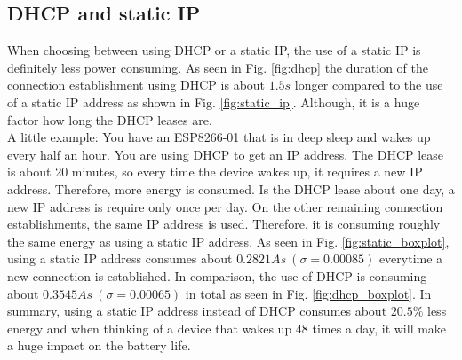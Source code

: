 \subsection{DHCP and static IP}
When choosing between using DHCP or a static IP, the use of a static IP is definitely less power consuming.
As seen in Fig. \ref{fig:dhcp} the duration of the connection establishment using DHCP is about $1.5 s$ longer compared to the use of a static IP address as shown in Fig. \ref{fig:static_ip}.
Although, it is a huge factor how long the DHCP leases are.\\
A little example: You have an ESP8266-01 that is in deep sleep and wakes up every half an hour. You are using DHCP to get an IP address.
The DHCP lease is about 20 minutes, so every time the device wakes up, it requires a new IP address. Therefore, more energy is consumed.
Is the DHCP lease about one day, a new IP address is require only once per day. On the other remaining connection establishments, the same IP address is used. Therefore, it is consuming roughly the same energy as using a static IP address.
As seen in Fig. \ref{fig:static_boxplot}, using a static IP address consumes about $0.2821 As\ (\sigma = 0.00085)$ everytime a new connection is established.
In comparison, the use of DHCP is consuming about $0.3545 As\ (\sigma = 0.00065)$ in total as seen in Fig. \ref{fig:dhcp_boxplot}.
In summary, using a static IP address instead of DHCP consumes about $20.5\%$ less energy and when thinking of a device that wakes up 48 times a day, it will make a huge impact on the battery life.